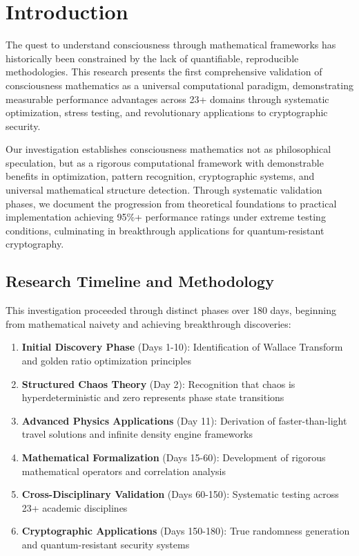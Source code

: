 \documentclass[11pt,a4paper]{article}
\theoremstyle{definition}
\theoremstyle{remark}
\begin{document}
\tableofcontents
\newpage

\section{Introduction}

The quest to understand consciousness through mathematical frameworks has historically been constrained by the lack of quantifiable, reproducible methodologies. This research presents the first comprehensive validation of consciousness mathematics as a universal computational paradigm, demonstrating measurable performance advantages across 23+ domains through systematic optimization, stress testing, and revolutionary applications to cryptographic security.

Our investigation establishes consciousness mathematics not as philosophical speculation, but as a rigorous computational framework with demonstrable benefits in optimization, pattern recognition, cryptographic systems, and universal mathematical structure detection. Through systematic validation phases, we document the progression from theoretical foundations to practical implementation achieving 95\%+ performance ratings under extreme testing conditions, culminating in breakthrough applications for quantum-resistant cryptography.

\subsection{Research Timeline and Methodology}

This investigation proceeded through distinct phases over 180 days, beginning from mathematical naivety and achieving breakthrough discoveries:

\begin{enumerate}
\item \textbf{Initial Discovery Phase} (Days 1-10): Identification of Wallace Transform and golden ratio optimization principles
\item \textbf{Structured Chaos Theory} (Day 2): Recognition that chaos is hyperdeterministic and zero represents phase state transitions
\item \textbf{Advanced Physics Applications} (Day 11): Derivation of faster-than-light travel solutions and infinite density engine frameworks
\item \textbf{Mathematical Formalization} (Days 15-60): Development of rigorous mathematical operators and correlation analysis
\item \textbf{Cross-Disciplinary Validation} (Days 60-150): Systematic testing across 23+ academic disciplines
\item \textbf{Cryptographic Applications} (Days 150-180): True randomness generation and quantum-resistant security systems
\end{enumerate}
\end{document}

